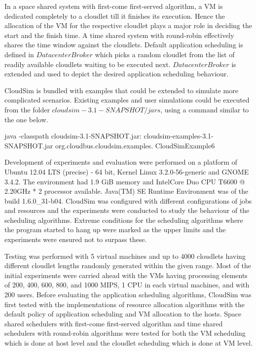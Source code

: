 \documentclass[times, 10pt,twocolumn]{article}
\begin{document}
In a space shared system with first-come first-served algorithm, a VM is dedicated completely to a cloudlet till it finishes its execution. Hence the allocation of the VM for the respective cloudlet plays a major role in deciding the start and the finish time. A time shared system with round-robin effectively shares the time window against the cloudlets. Default application scheduling is defined in $DatacenterBroker$ which picks a random cloudlet from the list of readily available cloudlets waiting to be executed next. $DatacenterBroker$ is extended and used to depict the desired application scheduling behaviour.

CloudSim is bundled with examples that could be extended to simulate more complicated scenarios. Existing examples and user simulations could be executed from the folder $cloudsim-3.1-SNAPSHOT/jars$, using a command similar to the one below.
\begin{verbatimtab}
java -classpath
    cloudsim-3.1-SNAPSHOT.jar:
    cloudsim-examples-3.1-SNAPSHOT.jar 
    org.cloudbus.cloudsim.examples.
    CloudSimExample6
\end{verbatimtab}

Development of experiments and evaluation were performed on a platform of Ubuntu 12.04 LTS (precise) - 64 bit, Kernel Linux 3.2.0-56-generic and GNOME 3.4.2. The environment had 1.9 GiB memory and Intel\textregistered Core Duo CPU T6600 @ 2.20GHz * 2 processor available. Java(TM) SE Runtime Environment was of the build 1.6.0\_31-b04.
CloudSim was configured with different configurations of jobs and resources and the experiments were conducted to study the behaviour of the scheduling algorithms. Extreme conditions for the scheduling algorithms where the program started to hang up were marked as the upper limits and the experiments were ensured not to surpass these. 

Testing was performed with 5 virtual machines and up to 4000 cloudlets having different cloudlet lengths randomly generated within the given range. Most of the initial experiments were carried ahead with the VMs having processing elements of 200, 400, 600, 800, and 1000 MIPS, 1 CPU in each virtual machines, and with 200 users.
Before evaluating the application scheduling algorithms, CloudSim was first tested with the implementations of resource allocation algorithms with the default policy of application scheduling and VM allocation to the hosts. Space shared schedulers with first-come first-served algorithm and time shared schedulers with round-robin algorithms were tested for both the VM scheduling which is done at host level and the cloudlet scheduling which is done at VM level. 
\end{document}
